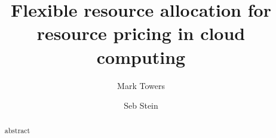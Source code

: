 \documentclass[sigconf]{aamas}
\begin{document}
\title{Flexible resource allocation for resource pricing in cloud computing}  %

\author{Mark Towers}

\author{Seb Stein}

\begin{abstract}
    abstract %
\end{abstract}


\maketitle





\end{document}
